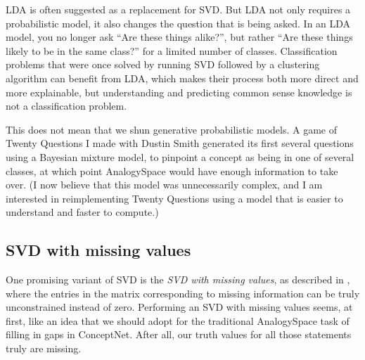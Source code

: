 \documentclass[11pt]{article}
\begin{document}
LDA \cite{lda} is often suggested as a replacement for SVD. But LDA not only
requires a probabilistic model, it also changes the question that is being
asked. In an LDA model, you no longer ask ``Are these things alike?'', but
rather ``Are these things likely to be in the same class?'' for a limited
number of classes. Classification problems that were once solved by running SVD
followed by a clustering algorithm can benefit from LDA, which makes their
process both more direct and more explainable, but understanding and predicting
common sense knowledge is not a classification problem.

This does not mean that we shun generative probabilistic models. A game of
Twenty Questions I made with Dustin Smith \cite{20q} generated its first
several questions using a Bayesian mixture model, to pinpoint a concept as
being in one of several classes, at which point AnalogySpace would have enough
information to take over. (I now believe that this model was unnecessarily
complex, and I am interested in reimplementing Twenty Questions using a model
that is easier to understand and faster to compute.)

%
%

\subsection{SVD with missing values}

One promising variant of SVD is the {\em SVD with missing values}, as described in
\cite{unholyalliance}, where the
entries in the matrix corresponding to missing information can be truly
unconstrained instead of zero.  Performing an SVD with missing values seems, at
first, like an idea that we should adopt for the traditional AnalogySpace task
of filling in gaps in ConceptNet. After all, our truth values for all those
statements truly are missing.
\end{document}
